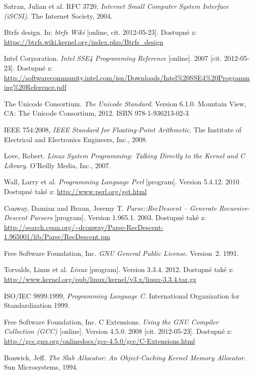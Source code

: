 \begin{thebibliography}{99}
  {\sc Satran, Julian et al.}
  RFC 3720, \emph{Internet Small Computer System Interface (iSCSI)}.
  The Internet Society, 2004.

  Btrfs design.
  In: \emph{btrfs Wiki} [online, cit. 2012-05-23].
  Dostupné z: \\ \url{https://btrfs.wiki.kernel.org/index.php/Btrfs_design}

  {\sc Intel Corporation}.
  \emph{Intel SSE4 Programming Reference} [online]. 2007 [cit. 2012-05-23].
  Dostupné z: \url{http://softwarecommunity.intel.com/isn/Downloads/Intel\%20SSE4\%20Programming\%20Reference.pdf}

  {\sc The Unicode Consortium}.
  \emph{The Unicode Standard}. Version 6.1.0.
  Mountain View, CA: The Unicode Consortium, 2012. ISBN 978-1-936213-02-3

  IEEE 754:2008, \emph{IEEE Standard for Floating-Point Arithmetic}.
  The Institute of Electrical and Electronics Engineers, Inc., 2008.

  {\sc Love, Robert}.
  \emph{Linux System Programming: Talking Directly to the Kernel and C Library}.
  O'Reilly Media, Inc., 2007.

  {\sc Wall, Larry et al.}
  \emph{Programming Language Perl} [program]. Version 5.4.12. 2010.
  Dostupné také z: \url{http://www.perl.org/get.html}

  {\sc Conway, Damian and Braun, Jeremy T.}
  \emph{Parse::RecDescent -- Generate Recursive-Descent Parsers} [program].
  Version 1.965.1. 2003. %
  Dostupné také z: \url{http://search.cpan.org/~dconway/Parse-RecDescent-1.965001/lib/Parse/RecDescent.pm}

  {\sc Free Software Foundation, Inc.}
  \emph{GNU General Public License}. Version~2. 1991.

  {\sc Torvalds, Linus et al.}
  \emph{Linux} [program]. Version 3.3.4. 2012.
  Dostupné také z: \url{http://www.kernel.org/pub/linux/kernel/v3.x/linux-3.3.4.tar.gz}

  ISO/IEC 9899:1999, \emph{Programming Language C}.
  International Organization for Standardization 1999. 

  {\sc Free Software Foundation, Inc.}
  C Extensions. \emph{Using the GNU Compiler Collection (GCC)} [online]. Version 4.5.0.
  2008 [cit. 2012-05-23].
  Dostupné z: \url{http://gcc.gnu.org/onlinedocs/gcc-4.5.0/gcc/C-Extensions.html}

  {\sc Bonwick, Jeff.}
  \emph{The Slab Allocator: An Object-Caching Kernel Memory Allocator}.
  Sun Microsystems, 1994.

\end{thebibliography}

